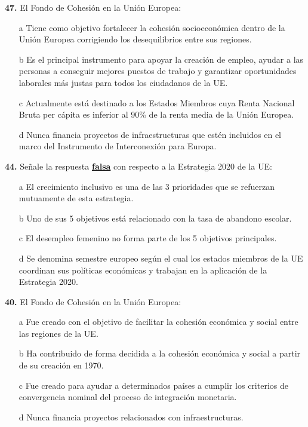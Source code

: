 \documentclass{nuevotema}
\begin{document}

\textbf{47.} El Fondo de Cohesión en la Unión Europea:
\begin{itemize}
	\item[a] Tiene como objetivo fortalecer la cohesión socioeconómica dentro de la Unión Europea corrigiendo los desequilibrios entre sus regiones.
	\item[b] Es el principal instrumento para apoyar la creación de empleo, ayudar a las personas a conseguir mejores puestos de trabajo y garantizar oportunidades laborales más justas para todos los ciudadanos de la UE.
	\item[c] Actualmente está destinado a los Estados Miembros cuya Renta Nacional Bruta per cápita es inferior al 90\% de la renta media de la Unión Europea.
	\item[d] Nunca financia proyectos de infraestructuras que estén incluidos en el marco del Instrumento de Interconexión para Europa.
\end{itemize}

\textbf{44.} Señale la respuesta \textbf{\underline{falsa}} con respecto a la Estrategia 2020 de la UE:
\begin{itemize}
	\item[a] El crecimiento inclusivo es una de las 3 prioridades que se refuerzan mutuamente de esta estrategia.
	\item[b] Uno de sus 5 objetivos está relacionado con la tasa de abandono escolar.
	\item[c] El desempleo femenino no forma parte de los 5 objetivos principales.
	\item[d] Se denomina semestre europeo según el cual los estados miembros de la UE coordinan sus políticas económicas y trabajan en la aplicación de la Estrategia 2020.
\end{itemize}

\textbf{40.} El Fondo de Cohesión en la Unión Europea:
\begin{itemize}
	\item[a] Fue creado con el objetivo de facilitar la cohesión económica y social entre las regiones de la UE.
	\item[b] Ha contribuido de forma decidida a la cohesión económica y social a partir de su creación en 1970.
	\item[c] Fue creado para ayudar a determinados países a cumplir los criterios de convergencia nominal del proceso de integración monetaria.
	\item[d] Nunca financia proyectos relacionados con infraestructuras.
\end{itemize}
\end{document}
